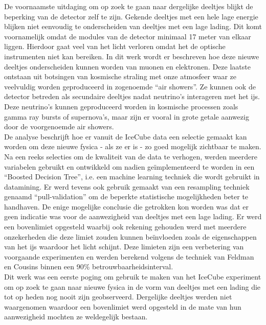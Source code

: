 \noindent De voornaamste uitdaging om op zoek te gaan naar dergelijke deeltjes blijkt de beperking van de detector zelf te zijn. Gekende deeltjes met een hele lage energie blijken niet eenvoudig te onderscheiden van deeltjes met een lage lading. Dit komt voornamelijk omdat de modules van de detector minimaal 17 meter van elkaar liggen. Hierdoor gaat veel van het licht verloren omdat het de optische instrumenten niet kan bereiken. In dit werk wordt er beschreven hoe deze nieuwe deeltjes onderscheiden kunnen worden van muonen en elektronen. Deze laatste ontstaan uit botsingen van kosmische straling met onze atmosfeer waar ze veelvuldig worden geproduceerd in zogenoemde ``air showers''. Ze kunnen ook de detector betreden als secundaire deeltjes nadat neutrino's interageren met het ijs. Deze neutrino's kunnen geproduceerd worden in kosmische processen zoals gamma ray bursts of supernova's, maar zijn er vooral in grote getale aanwezig door de voorgenoemde air showers.\\

\noindent De analyse beschrijft hoe er vanuit de IceCube data een selectie gemaakt kan worden om deze nieuwe fysica - als ze er is - zo goed mogelijk zichtbaar te maken. Na een reeks selecties om de kwaliteit van de data te verhogen, werden meerdere variabelen gebruikt en ontwikkeld om nadien ge\"implementeerd te worden in een ``Boosted Decision Tree'', i.e. een machine learning techniek die wordt gebruikt in datamining. Er werd tevens ook gebruik gemaakt van een resampling techniek genaamd ``pull-validation'' om de beperkte statistische mogelijkheden beter te handhaven. De enige mogelijke conclusie die getrokken kon worden was dat er geen indicatie was voor de aanwezigheid van deeltjes met een lage lading. Er werd een bovenlimiet opgesteld waarbij ook rekening gehouden werd met meerdere onzekerheden die deze limiet zouden kunnen be\"invloeden zoals de eigenschappen van het ijs waardoor het licht schijnt. Deze limieten zijn een verbetering van voorgaande experimenten en werden berekend volgens de techniek van Feldman en Cousins binnen een 90\% betrouwbaarheidsinterval.\\

\noindent Dit werk was een eerste poging om gebruik te maken van het IceCube experiment om op zoek te gaan naar nieuwe fysica in de vorm van deeltjes met een lading die tot op heden nog nooit zijn geobserveerd. Dergelijke deeltjes werden niet waargenomen waardoor een bovenlimiet werd opgesteld in de mate van hun aanwezigheid mochten ze weldegelijk bestaan.
